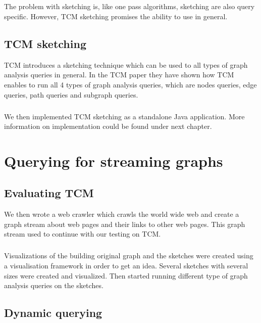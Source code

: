 \documentclass[12pt]{report}
\numberwithin{figure}{section}
\numberwithin{table}{section}
\begin{document}
\paragraph{}

The problem with sketching is, like one pass algorithms, sketching are also query specific. However, TCM sketching promises the ability to use in general. 

\section{TCM sketching}

TCM introduces a sketching technique which can be used to all types of graph analysis queries in general. In the TCM paper they have shown how TCM enables to run all 4 types of graph analysis queries, which are nodes queries, edge queries, path queries and subgraph queries. 

\paragraph{}

We then implemented TCM sketching as a standalone Java application. More information on implementation could be found under next chapter.

\chapter{Querying for streaming graphs}
\section{Evaluating TCM}

We then wrote a web crawler which crawls the world wide web and create a graph stream about web pages and their links to other web pages. This graph stream used to continue with our testing on TCM. 

\paragraph{}

Visualizations of the building original graph and the sketches were created using a visualisation framework in order to get an idea. Several sketches with several sizes were created and visualized. Then started running different type of graph analysis queries on the sketches. 

\section{Dynamic querying}
\end{document}
